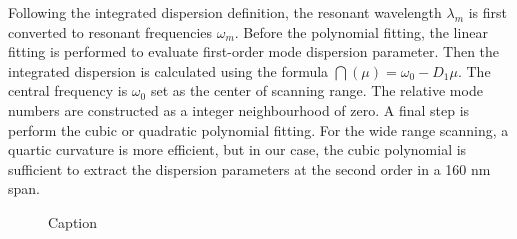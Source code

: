 Following the integrated dispersion definition, the resonant wavelength $\lambda_m$ is first converted to resonant frequencies $\omega_m$. Before the polynomial fitting, the linear fitting is performed to evaluate first-order mode dispersion parameter. Then the integrated dispersion is calculated using the formula $ \dint(\mu) = \omega_0 - D_1 \mu$. The central frequency is $\omega_0$ set as the center of scanning range. The relative mode numbers are constructed as a integer neighbourhood of zero. A final step is perform the cubic or quadratic polynomial fitting. For the wide range scanning, a quartic curvature is more efficient, but in our case, the cubic polynomial is sufficient to extract the dispersion parameters at the second order in a 160 nm span.






\begin{figure}
	\centering
	
	\caption{Caption}
	\label{fig:ligentec_dint_cf}
\end{figure}
